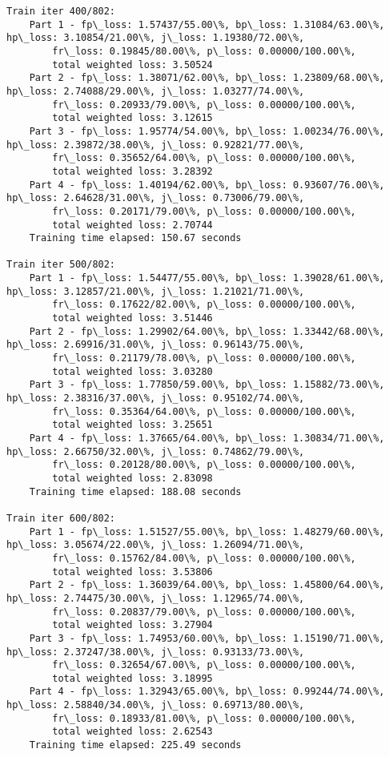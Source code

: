\documentclass[11pt]{article}
\begin{document}
\begin{Verbatim}[commandchars=\\\{\}]
Train iter 400/802:
	Part 1 - fp\_loss: 1.57437/55.00\%, bp\_loss: 1.31084/63.00\%, hp\_loss: 3.10854/21.00\%, j\_loss: 1.19380/72.00\%, 
		fr\_loss: 0.19845/80.00\%, p\_loss: 0.00000/100.00\%, 
		total weighted loss: 3.50524
	Part 2 - fp\_loss: 1.38071/62.00\%, bp\_loss: 1.23809/68.00\%, hp\_loss: 2.74088/29.00\%, j\_loss: 1.03277/74.00\%, 
		fr\_loss: 0.20933/79.00\%, p\_loss: 0.00000/100.00\%, 
		total weighted loss: 3.12615
	Part 3 - fp\_loss: 1.95774/54.00\%, bp\_loss: 1.00234/76.00\%, hp\_loss: 2.39872/38.00\%, j\_loss: 0.92821/77.00\%, 
		fr\_loss: 0.35652/64.00\%, p\_loss: 0.00000/100.00\%, 
		total weighted loss: 3.28392
	Part 4 - fp\_loss: 1.40194/62.00\%, bp\_loss: 0.93607/76.00\%, hp\_loss: 2.64628/31.00\%, j\_loss: 0.73006/79.00\%, 
		fr\_loss: 0.20171/79.00\%, p\_loss: 0.00000/100.00\%, 
		total weighted loss: 2.70744
	Training time elapsed: 150.67 seconds

Train iter 500/802:
	Part 1 - fp\_loss: 1.54477/55.00\%, bp\_loss: 1.39028/61.00\%, hp\_loss: 3.12857/21.00\%, j\_loss: 1.21021/71.00\%, 
		fr\_loss: 0.17622/82.00\%, p\_loss: 0.00000/100.00\%, 
		total weighted loss: 3.51446
	Part 2 - fp\_loss: 1.29902/64.00\%, bp\_loss: 1.33442/68.00\%, hp\_loss: 2.69916/31.00\%, j\_loss: 0.96143/75.00\%, 
		fr\_loss: 0.21179/78.00\%, p\_loss: 0.00000/100.00\%, 
		total weighted loss: 3.03280
	Part 3 - fp\_loss: 1.77850/59.00\%, bp\_loss: 1.15882/73.00\%, hp\_loss: 2.38316/37.00\%, j\_loss: 0.95102/74.00\%, 
		fr\_loss: 0.35364/64.00\%, p\_loss: 0.00000/100.00\%, 
		total weighted loss: 3.25651
	Part 4 - fp\_loss: 1.37665/64.00\%, bp\_loss: 1.30834/71.00\%, hp\_loss: 2.66750/32.00\%, j\_loss: 0.74862/79.00\%, 
		fr\_loss: 0.20128/80.00\%, p\_loss: 0.00000/100.00\%, 
		total weighted loss: 2.83098
	Training time elapsed: 188.08 seconds

Train iter 600/802:
	Part 1 - fp\_loss: 1.51527/55.00\%, bp\_loss: 1.48279/60.00\%, hp\_loss: 3.05674/22.00\%, j\_loss: 1.26094/71.00\%, 
		fr\_loss: 0.15762/84.00\%, p\_loss: 0.00000/100.00\%, 
		total weighted loss: 3.53806
	Part 2 - fp\_loss: 1.36039/64.00\%, bp\_loss: 1.45800/64.00\%, hp\_loss: 2.74475/30.00\%, j\_loss: 1.12965/74.00\%, 
		fr\_loss: 0.20837/79.00\%, p\_loss: 0.00000/100.00\%, 
		total weighted loss: 3.27904
	Part 3 - fp\_loss: 1.74953/60.00\%, bp\_loss: 1.15190/71.00\%, hp\_loss: 2.37247/38.00\%, j\_loss: 0.93133/73.00\%, 
		fr\_loss: 0.32654/67.00\%, p\_loss: 0.00000/100.00\%, 
		total weighted loss: 3.18995
	Part 4 - fp\_loss: 1.32943/65.00\%, bp\_loss: 0.99244/74.00\%, hp\_loss: 2.58840/34.00\%, j\_loss: 0.69713/80.00\%, 
		fr\_loss: 0.18933/81.00\%, p\_loss: 0.00000/100.00\%, 
		total weighted loss: 2.62543
	Training time elapsed: 225.49 seconds


\end{Verbatim}
\end{document}
